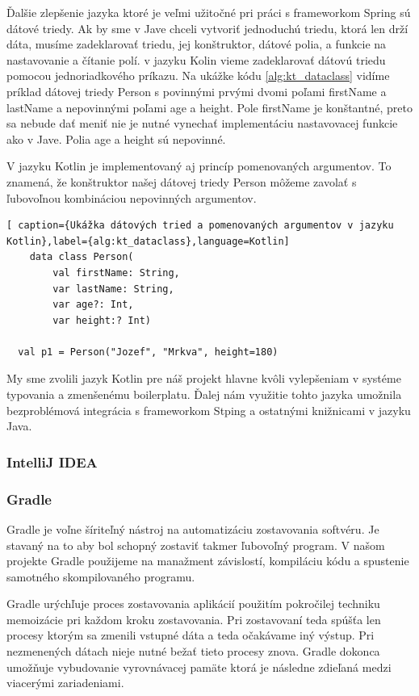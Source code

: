 Ďalšie zlepšenie jazyka ktoré je veľmi užitočné pri práci s frameworkom Spring sú dátové triedy. Ak by sme v Jave chceli vytvoriť jednoduchú triedu, ktorá len drží dáta, musíme zadeklarovať triedu, jej konštruktor, dátové polia, a funkcie na nastavovanie a čítanie polí. v jazyku Kolin vieme zadeklarovať dátovú triedu pomocou jednoriadkového príkazu. Na ukážke kódu \ref{alg:kt_dataclass} vidíme príklad dátovej triedy Person s povinnými prvými dvomi poľami firstName a lastName a nepovinnými poľami age a height. Pole firstName je konštantné, preto sa nebude dať meniť nie je nutné vynechať implementáciu nastavovacej funkcie ako v Jave. Polia age a height sú nepovinné.  
 
V jazyku Kotlin je implementovaný aj princíp pomenovaných argumentov. To znamená, že konštruktor našej dátovej triedy Person môžeme zavolať s ľubovoľnou kombináciou nepovinných argumentov. 

\begin{lstlisting}[ caption={Ukážka dátových tried a pomenovaných argumentov v jazyku Kotlin},label={alg:kt_dataclass},language=Kotlin]
	data class Person(
		val firstName: String,
		var lastName: String,
		var age?: Int,
		var height:? Int)

  val p1 = Person("Jozef", "Mrkva", height=180)		
	\end{lstlisting}



My sme zvolili jazyk Kotlin pre náš projekt hlavne kvôli vylepšeniam v systéme typovania a zmenšenému boilerplatu. Ďalej nám využitie tohto jazyka umožnila bezproblémová integrácia s frameworkom Stping a ostatnými knižnicami v jazyku Java.	

\subsubsection{IntelliJ IDEA}


\subsubsection{Gradle}
Gradle je voľne šíriteľný nástroj na automatizáciu zostavovania softvéru. Je stavaný na to aby bol schopný zostaviť takmer ľubovoľný program.  V našom projekte Gradle použijeme na manažment závislostí, kompiláciu kódu a spustenie samotného skompilovaného programu. 

Gradle urýchľuje proces zostavovania aplikácií použitím pokročilej techniku memoizácie pri každom kroku zostavovania. Pri zostavovaní teda spúšťa len procesy ktorým sa zmenili vstupné dáta  a teda očakávame iný výstup. Pri nezmenených dátach nieje nutné bežať tieto procesy znova. Gradle dokonca umožňuje vybudovanie vyrovnávacej pamäte ktorá je následne zdieľaná medzi viacerými zariadeniami.

